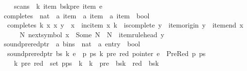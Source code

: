 \begin{isabellebody}
\ \ \ \ scans\ {\isasymomega}\ k\ {\isacharparenleft}{\kern0pt}item\ {\isacharparenleft}{\kern0pt}bs{\isacharbang}{\kern0pt}{\isacharparenleft}{\kern0pt}k{\isacharminus}{\kern0pt}{}{\isacharparenright}{\kern0pt}{\isacharbang}{\kern0pt}pre{\isacharparenright}{\kern0pt}{\isacharparenright}{\kern0pt}\ {\isacharparenleft}{\kern0pt}item\ e{\isacharparenright}{\kern0pt}{\isachardoublequoteclose}\isanewline
\isanewline
{}\isamarkupfalse%
\ completes\ {\isacharcolon}{\kern0pt}{\isacharcolon}{\kern0pt}\ {\isachardoublequoteopen}nat\ {\isasymRightarrow}\ {\isacharprime}{\kern0pt}a\ item\ {\isasymRightarrow}\ {\isacharprime}{\kern0pt}a\ item\ {\isasymRightarrow}\ {\isacharprime}{\kern0pt}a\ item\ {\isasymRightarrow}\ bool{\isachardoublequoteclose}\ \isanewline
\ \ {\isachardoublequoteopen}completes\ k\ x{\isacharprime}{\kern0pt}\ x\ y\ {\isasymequiv}\ x\ {\isacharequal}{\kern0pt}\ inc{\isacharunderscore}{\kern0pt}item\ x{\isacharprime}{\kern0pt}\ k\ {\isasymand}\ is{\isacharunderscore}{\kern0pt}complete\ y\ {\isasymand}\ item{\isacharunderscore}{\kern0pt}origin\ y\ {\isacharequal}{\kern0pt}\ item{\isacharunderscore}{\kern0pt}end\ x{\isacharprime}{\kern0pt}\ {\isasymand}\isanewline
\ \ \ \ {\isacharparenleft}{\kern0pt}{\isasymexists}N{\isachardot}{\kern0pt}\ next{\isacharunderscore}{\kern0pt}symbol\ x{\isacharprime}{\kern0pt}\ {\isacharequal}{\kern0pt}\ Some\ N\ {\isasymand}\ N\ {\isacharequal}{\kern0pt}\ item{\isacharunderscore}{\kern0pt}rule{\isacharunderscore}{\kern0pt}head\ y{\isacharparenright}{\kern0pt}{\isachardoublequoteclose}\isanewline
\isanewline
{}\isamarkupfalse%
\ sound{\isacharunderscore}{\kern0pt}prered{\isacharunderscore}{\kern0pt}ptr\ {\isacharcolon}{\kern0pt}{\isacharcolon}{\kern0pt}\ {\isachardoublequoteopen}{\isacharprime}{\kern0pt}a\ bins\ {\isasymRightarrow}\ nat\ {\isasymRightarrow}\ {\isacharprime}{\kern0pt}a\ entry\ {\isasymRightarrow}\ bool{\isachardoublequoteclose}\ \isanewline
\ \ {\isachardoublequoteopen}sound{\isacharunderscore}{\kern0pt}prered{\isacharunderscore}{\kern0pt}ptr\ bs\ k\ e\ {\isasymequiv}\ {\isasymforall}p\ ps\ k{\isacharprime}{\kern0pt}\ pre\ red{\isachardot}{\kern0pt}\ pointer\ e\ {\isacharequal}{\kern0pt}\ PreRed\ p\ ps\ {\isasymand}\isanewline
\ \ \ \ {\isacharparenleft}{\kern0pt}k{\isacharprime}{\kern0pt}{\isacharcomma}{\kern0pt}\ pre{\isacharcomma}{\kern0pt}\ red{\isacharparenright}{\kern0pt}\ {\isasymin}\ set\ {\isacharparenleft}{\kern0pt}p{\isacharhash}{\kern0pt}ps{\isacharparenright}{\kern0pt}\ {\isasymlongrightarrow}\ k{\isacharprime}{\kern0pt}\ {\isacharless}{\kern0pt}\ k\ {\isasymand}\ pre\ {\isacharless}{\kern0pt}\ {\isacharbar}{\kern0pt}bs{\isacharbang}{\kern0pt}k{\isacharprime}{\kern0pt}{\isacharbar}{\kern0pt}\ {\isasymand}\ red\ {\isacharless}{\kern0pt}\ {\isacharbar}{\kern0pt}bs{\isacharbang}{\kern0pt}k{\isacharbar}{\kern0pt}\ {\isasymand}\isanewline

\end{isabellebody}
